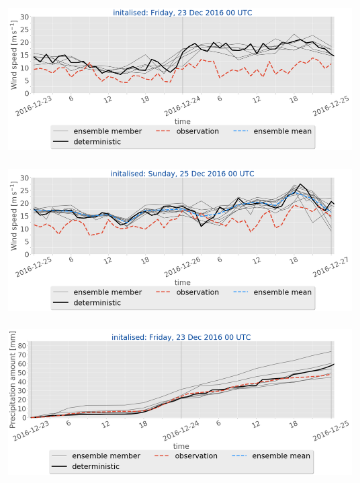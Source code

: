\begin{figure}[h!]
\begin{subfigure}[b]{0.49\textwidth}
    \end{subfigure}
    \begin{subfigure}[b]{0.49\textwidth}
    	\includegraphics[trim={0.cm 3.6cm 0cm 0cm},clip,
    width=\textwidth]{./fig_sfc_ws/20161223_00}
    	\caption{}\label{fig:res:sfc_ws23}
    \end{subfigure}
    \begin{subfigure}[b]{0.49\textwidth}
    	\includegraphics[trim={0.cm 3.6cm 0cm 0cm},clip,
    width=\textwidth]{./fig_sfc_ws/20161225_00}
    	\caption{}\label{fig:res:sfc_ws25}
    \end{subfigure}
    \begin{subfigure}[b]{0.49\textwidth}
    	\includegraphics[trim={0.cm 3.6cm 0cm 0cm},clip,
    width=\textwidth]{./fig_sfc_precip/20161223_00}
    	\caption{}\label{fig:res:sfc_precip23}
    \end{subfigure}

\end{figure}
